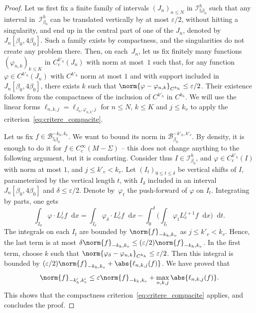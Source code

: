 \documentclass[10pt]{amsart}
\newcommand{\boI}{\mathcal{I}}
\newcommand{\boB}{\mathcal{B}}
\newcommand{\dd}{\mathop{}\!\mathrm{d}}
\newcommand{\paregg}[1]{\biggl(#1\biggr)}
\let\epsilon\varepsilon
\let\phi\varphi
\theoremstyle{definition}
\numberwithin{equation}{section}
\begin{document}
\begin{proof}
Let us first fix a finite family of intervals $(J_n)_{n\leq N}$ in
$\boI^h_{5\beta_0}$ such that any interval in~$\boI^h_{\beta_0}$ can be
translated vertically by at most $\epsilon/2$, without hitting a singularity,
and end up in the central part of one of the $J_n$, denoted by
$J_n[\beta_0,4\beta_0]$. Such a family exists by compactness, and the
singularities do not create any problem there. Then, on each~$J_n$, let us
fix finitely many functions $(\phi_{n,k})_{k\leq K}$ in $C^{k'_h}_c(J_n)$
with norm at most~$1$ such that, for any function $\phi \in C^{k'_h}(J_n)$
with $C^{k'_h}$ norm at most $1$ and with support included in $J_n[\beta_0,
4\beta_0]$, there exists $k$ such that $\norm{\phi - \phi_{n,k}}_{C^{k_h}}
\leq \epsilon/2$. Their existence follows from the compactness of the
inclusion of $C^{k'_h}$ in $C^{k_h}$. We will use the linear forms
$\ell_{n,k,j} = \ell_{J_n, \phi_{n,k}, j}$ for $n \leq N$, $k \leq K$ and $j
\leq k_v$ to apply the criterion~\eqref{eq:critere_compacite}.

Let us fix $f \in \boB^{-k_h, k_v}_{5\beta_0}$. We want to bound its norm in
$\boB^{-k'_h, k'_v}_{\beta_0}$. By density, it is enough to do it for $f \in
C^\infty_c(M-\Sigma)$ -- this does not change anything to the following
argument, but it is comforting. Consider thus $I \in \boI^h_{\beta_0}$, and
$\phi \in C_c^{k'_h}(I)$ with norm at most $1$, and $j \leq k'_v < k_v$. Let
$(I_t)_{0 \leq t \leq \delta}$ be vertical shifts of $I$, parameterized by
the vertical length $t$, with $I_\delta$ included in an interval
$J_n[\beta_0,4\beta_0]$ and $\delta \leq \epsilon/2$. Denote by~$\phi_t$ the
push-forward of $\phi$ on $I_t$. Integrating by parts, one gets
\begin{equation*}
\int_{I_0} \phi\cdot L_v^j f \dd x = \int_{I_\delta} \phi_\delta \cdot L_v^j f \dd x
-\int_0^\delta \paregg{\int_{I_t} \phi_t L_v^{j+1}f \dd x} \dd t.
\end{equation*}
The integrals on each $I_t$ are bounded by $\norm{f}_{-k_h, k_v}$ as $j\leq
k'_v < k_v$. Hence, the last term is at most $\delta \norm{f}_{-k_h, k_v}
\leq (\epsilon/2) \norm{f}_{-k_h, k_v}$. In the first term, choose $k$ such
that $\norm{\phi_\delta - \phi_{n, k}}_{C^{k_h}} \leq \epsilon/2$. Then this
integral is bounded by $(\epsilon/2)\norm{f}_{-k_h, k_v} +
\abs{\ell_{n,k,j}(f)}$. We have proved that
\begin{equation*}
\norm{f}_{-k'_h, k'_v} \leq \epsilon \norm{f}_{-k_h, k_v} + \max_{n,k,j} \abs{\ell_{n,k,j}(f)}.
\end{equation*}
This shows that the compactness criterion~\eqref{eq:critere_compacite}
applies, and concludes the proof.
\end{proof}
\end{document}
